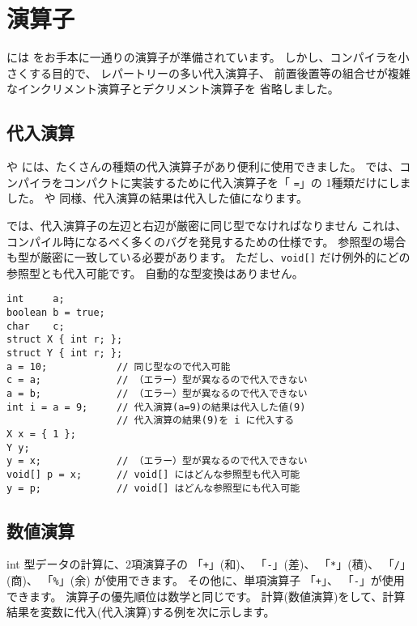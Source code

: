 \section{演算子}

\cmml には \cl をお手本に一通りの演算子が準備されています。
しかし、コンパイラを小さくする目的で、
レパートリーの多い代入演算子、
前置後置等の組合せが複雑なインクリメント演算子とデクリメント演算子を
省略しました。

\subsection{代入演算}

\cl や \javal には、たくさんの種類の代入演算子があり便利に使用できました。
\cmml では、コンパイラをコンパクトに実装するために代入演算子を「 \verb/=/」の
1種類だけにしました。
\cl や \javal 同様、代入演算の結果は代入した値になります。

\cmml では、代入演算子の左辺と右辺が厳密に同じ型でなければなりません
これは、コンパイル時になるべく多くのバグを発見するための仕様です。
参照型の場合も型が厳密に一致している必要があります。
ただし、\verb/void[]/ だけ例外的にどの参照型とも代入可能です。
自動的な型変換はありません。

\begin{mylist}
\begin{verbatim}
int     a;
boolean b = true;
char    c;
struct X { int r; };
struct Y { int r; };
a = 10;            // 同じ型なので代入可能
c = a;             // （エラー）型が異なるので代入できない
a = b;             // （エラー）型が異なるので代入できない
int i = a = 9;     // 代入演算(a=9)の結果は代入した値(9)
                   // 代入演算の結果(9)を i に代入する
X x = { 1 };
Y y;
y = x;             // （エラー）型が異なるので代入できない
void[] p = x;      // void[] にはどんな参照型も代入可能
y = p;             // void[] はどんな参照型にも代入可能
\end{verbatim}
\end{mylist}

\subsection{数値演算}

int 型データの計算に、2項演算子の
「\verb/+/」(和)、
「\verb/-/」(差)、
「\verb/*/」(積)、
「\verb+/+」(商)、
「\verb/%/」(余)
が使用できます。
その他に、単項演算子
「\verb/+/」、
「\verb/-/」が使用できます。
演算子の優先順位は数学と同じです。
計算(数値演算)をして、計算結果を変数に代入(代入演算)する例を次に示します。

